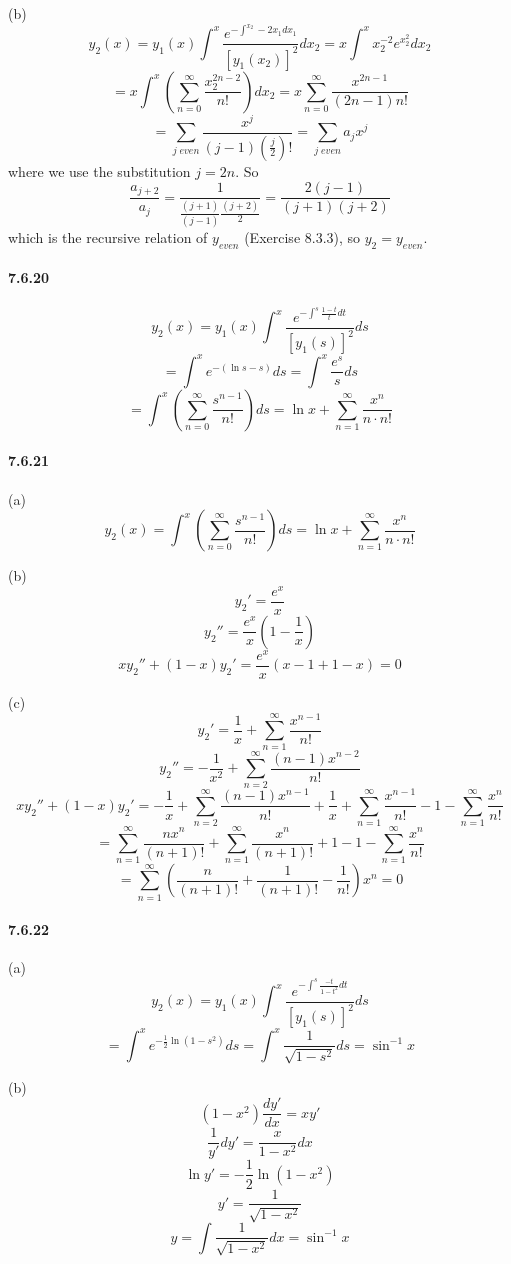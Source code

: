 \documentclass[a4paper]{article}
\begin{document}
(b)
\[
y_2(x)=y_1(x)\int^x\frac{e^{-\int^{x_2}-2x_1dx_1}}{[y_1(x_2)]^2}dx_2
=x\int^xx_2^{-2}e^{x_2^2}dx_2\]
\[=x\int^x\left(\sum_{n=0}^\infty\frac{x_2^{2n-2}}{n!}\right)dx_2=x\sum_{n=0}^\infty\frac{x^{2n-1}}{(2n-1)n!}\]
\[=\sum_{j\;even}\frac{x^j}{(j-1)(\frac{j}{2})!}=\sum_{j\;even}a_jx^j
\]
where we use the substitution $j=2n$. So
\[
\frac{a_{j+2}}{a_j}=\frac{1}{\frac{(j+1)}{(j-1)}\frac{(j+2)}{2}}=\frac{2(j-1)}{(j+1)(j+2)}
\]
which is the recursive relation of $y_{even}$ (Exercise 8.3.3), so $y_2=y_{even}$.

\paragraph{7.6.20}
\[
y_2(x)=y_1(x)\int^x\frac{e^{-\int^s\frac{1-t}{t}dt}}{[y_1(s)]^2}ds
\]
\[
=\int^xe^{-(\ln s-s)}ds=\int^x\frac{e^s}{s}ds
\]
\[
=\int^x\left(\sum_{n=0}^\infty\frac{s^{n-1}}{n!}\right)ds=\ln x+\sum_{n=1}^\infty\frac{x^n}{n\cdot n!}
\]

\paragraph{7.6.21}
(a) 
\[
y_2(x)=\int^x\left(\sum_{n=0}^\infty\frac{s^{n-1}}{n!}\right)ds=\ln x+\sum_{n=1}^\infty\frac{x^n}{n\cdot n!}
\]

(b) 
\[
y_2'=\frac{e^x}{x}\]
\[y_2''=\frac{e^x}{x}(1-\frac{1}{x})
\]
\[
xy_2''+(1-x)y_2'=\frac{e^x}{x}(x-1+1-x)=0
\]

(c) 
\[
y_2'=\frac{1}{x}+\sum_{n=1}^\infty\frac{x^{n-1}}{n!}
\]
\[
y_2''=-\frac{1}{x^2}+\sum_{n=2}^\infty\frac{(n-1)x^{n-2}}{n!}
\]
\[
xy_2''+(1-x)y_2'=-\frac{1}{x}+\sum_{n=2}^\infty\frac{(n-1)x^{n-1}}{n!}+\frac{1}{x}+\sum_{n=1}^\infty\frac{x^{n-1}}{n!}-1-\sum_{n=1}^\infty\frac{x^n}{n!}
\]
\[
=\sum_{n=1}^\infty\frac{nx^n}{(n+1)!}+\sum_{n=1}^\infty\frac{x^n}{(n+1)!}+1-1-\sum_{n=1}^\infty\frac{x^n}{n!}
\]
\[
=\sum_{n=1}^\infty\left(\frac{n}{(n+1)!}+\frac{1}{(n+1)!}-\frac{1}{n!}\right)x^n=0
\]

\paragraph{7.6.22}
(a)
\[
y_2(x)=y_1(x)\int^x\frac{e^{-\int^s\frac{-t}{1-t^2}dt}}{[y_1(s)]^2}ds
\]
\[
=\int^xe^{-\frac{1}{2}\ln(1-s^2)}ds=\int^x\frac{1}{\sqrt{1-s^2}}ds=\sin^{-1}x
\]

(b)
\[
(1-x^2)\frac{dy'}{dx}=xy'
\]
\[
\frac{1}{y'}dy'=\frac{x}{1-x^2}dx
\]
\[
\ln y'=-\frac{1}{2}\ln(1-x^2)
\]
\[
y'=\frac{1}{\sqrt{1-x^2}}
\]
\[
y=\int\frac{1}{\sqrt{1-x^2}}dx=\sin^{-1}x
\]
\end{document}
